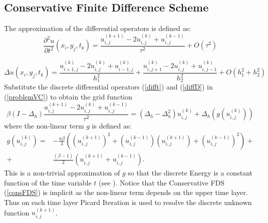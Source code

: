 \documentclass[%
 aip,
cp,  %
 amsmath,amssymb,%
 reprint,%
]{revtex4-2}
\newcommand{\be}{\begin{equation}}
\newcommand{\ee}{\end{equation}}
\newcommand{\rf}[1]{(\ref{#1})}
\begin{document}
\subsection{ Conservative Finite Difference Scheme }

The approximation of the differential operators is defined as:
\be\label{difft}
\frac{\partial^2 u}{\partial t^2}(x_i, y_j, t_k ) = \frac{ u^{(k+1)}_{i, j} - 2u^{(k)}_{i,j} + u^{(k-1)}_{i,j} }{\tau^2} + O(\tau^2) 
\ee

\be\label{diffD}
\Delta u(x_i, y_j, t_k )  = \frac{ u^{(k)}_{i+1, j} - 2u^{(k)}_{i,j} + u^{(k)}_{i-1,j} }{h_1^2} + \frac{ u^{(k)}_{i, j+1} - 2u^{(k)}_{i,j} + u^{(k)}_{i,j-1} }{h_2^2} + O(h_1^2 + h_2^2) 
\ee
Substitute the discrete differential operators \rf{difft} and \rf{diffD} in \rf{problemVC} to obtain the grid function
\be\label{consFDS}
\beta (I-\Delta_h)\frac{ u^{(k+1)}_{i, j} - 2u^{(k)}_{i,j} + u^{(k-1)}_{i,j} }{\tau^2} = (\Delta_h - \Delta_h^2)u^{(k)}_{i,j} + \Delta_h(g(u^{(k)}_{i,j}))
\ee
%
where the non-linear term $g$ is defined as:
\begin{align}
g(u^{(k)}_{i,j})=& -\frac{\alpha \beta} { 3 } \left( (u^{(k+1)}_{i,j})^2 + (u^{(k-1)}_{i,j})(u^{(k+1)}_{i,j}) + (u^{(k-1)}_{i,j})^2 \right) + \nonumber\\
+&\frac{ (\beta - 1 )}{ 2 }\left( u^{(k+1)}_{i,j} + u^{(k-1)}_{i,j} \right).
\end{align}
This is a non-trivial approximation of $g$ so that the discrete Energy is a constant function of the time variable $t$ (see \cite{ref20}). Notice that the Conservative FDS \rf{consFDS} is implicit as the non-linear term depends on the upper time layer. Thus on each time layer Picard Iteration is used to resolve the discrete unknown function $u^{(k+1)}_{i,j}$.
\end{document}
